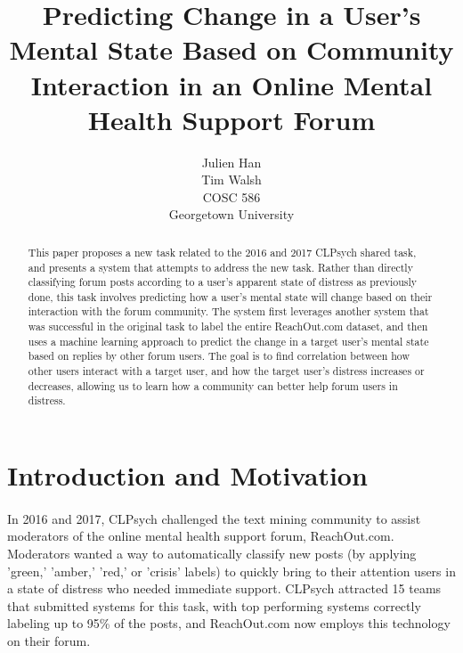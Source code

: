 \documentclass{article}
\begin{document}
\title{Predicting Change in a User's Mental State Based on Community Interaction in an Online Mental Health Support Forum}
\author{
Julien Han\\
Tim Walsh\\
COSC 586\\
Georgetown University\\
}
\maketitle

\begin{abstract}
This paper proposes a new task related to the 2016 and 2017 CLPsych shared task, and presents a system that attempts to address the new task. Rather than directly classifying forum posts according to a user's apparent state of distress as previously done, this task involves predicting how a user's mental state will change based on their interaction with the forum community. The system first leverages another system that was successful in the original task to label the entire ReachOut.com dataset, and then uses a machine learning approach to predict the change in a target user's mental state based on replies by other forum users. The goal is to find correlation between how other users interact with a target user, and how the target user's distress increases or decreases, allowing us to learn how a community can better help forum users in distress.
\end{abstract}

\section{Introduction and Motivation}

\paragraph{}In 2016 and 2017, CLPsych challenged the text mining community to assist moderators of the online mental health support forum, ReachOut.com. Moderators wanted a way to automatically classify new posts (by applying 'green,' 'amber,' 'red,' or 'crisis' labels) to quickly bring to their attention users in a state of distress who needed immediate support. CLPsych attracted 15 teams that submitted systems for this task, with top performing systems correctly labeling up to 95\% of the posts, and ReachOut.com now employs this technology on their forum\cite{milne}\cite{cohan2}.
\end{document}

